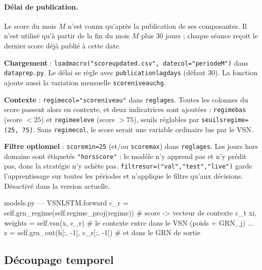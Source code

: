 \documentclass[11pt,a4paper]{article}
\renewcommand{\_}{\usorig\allowbreak}   %
\newcommand{\f}[1]{\texttt{#1}}        %
\begin{document}
\paragraph{Délai de publication.} Le score du mois $M$ n'est connu qu'après la publication
de ses composantes. Il n'est utilisé qu'à partir de la fin du mois $M$ plus 30 jours ;
chaque séance reçoit le dernier score déjà publié à cette date.

\begin{danslecode}
\textbf{Chargement} : \f{load\_macro("score\_updated.csv", date\_col="periode\_M")} dans
\f{data\_prep.py}. Le délai se règle avec \f{publication\_lag\_days} (défaut 30). La
fonction ajoute aussi la variation mensuelle \f{score\_niveau\_chg}.

\textbf{Contexte} : \f{regime\_col="score\_niveau"} dans \f{reglages}. Toutes les colonnes
du score passent alors en contexte, et deux indicatrices sont ajoutées :
\f{regime\_bas} (score $<25$) et \f{regime\_eleve} (score $>75$), seuils réglables par
\f{seuils\_regime=(25, 75)}. Sans \f{regime\_col}, le score serait une variable ordinaire
lue par le VSN.

\textbf{Filtre optionnel} : \f{score\_min=25} (et/ou \f{score\_max}) dans \f{reglages}. Les
jours hors domaine sont étiquetés \f{"hors\_score"} : le modèle n'y apprend pas et n'y
prédit pas, donc la stratégie n'y achète pas. \f{filtre\_sur=("val","test","live")}
garde l'apprentissage sur toutes les périodes et n'applique le filtre qu'aux décisions.
Désactivé dans la version actuelle.
\end{danslecode}

\begin{code}{models.py --- VSNLSTM.forward}
c_r = self.grn_regime(self.regime_proj(regime))   # score -> vecteur de contexte c_t
xi, weights = self.vsn(x, c_r)                    # le contexte entre dans le VSN (poids + GRN_j)
...
z = self.grn_out(h[:, -1], c_r[:, -1])            # et dans le GRN de sortie
\end{code}

\subsection{Découpage temporel}\label{sec:decoupage}
\end{document}
